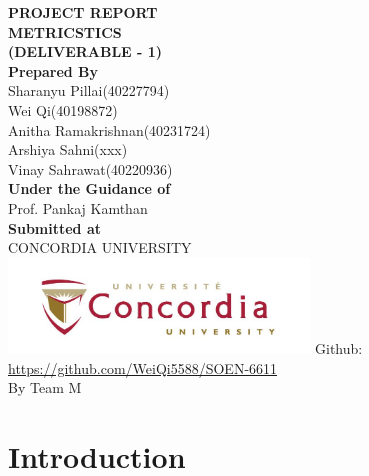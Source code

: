 \documentclass[english,12pt,a4paper]{report}
\begin{document}
	\begin{titlepage}
		\centering
		\Huge
		\textbf{PROJECT REPORT}\\
		\vspace{1cm}
		\textbf{METRICSTICS}\\
		\textbf{(DELIVERABLE - 1)}\\
		\vspace{1.5cm}
		\Large
		\textbf{Prepared By}\\
		\vspace{0.5cm}
		Sharanyu Pillai(40227794)\\
		Wei Qi(40198872)\\
		Anitha Ramakrishnan(40231724)\\
		Arshiya Sahni(xxx)\\
		Vinay Sahrawat(40220936)\\
		\vspace{1.5cm}
		\large
		\textbf{Under the Guidance of}\\
		Prof. Pankaj Kamthan \\
		\vspace{1.5cm}
		\textbf{Submitted at}\\
		CONCORDIA UNIVERSITY\\
		\centering
		\includegraphics[width=8cm]{concordia.jpg}
		\vfill
		Github:\\
		\url{https://github.com/WeiQi5588/SOEN-6611} \\
		By Team M
		\thispagestyle{empty} 
	\end{titlepage}
	
	\newpage 
	\setcounter{page}{0}
	\tableofcontents
	\clearpage
	
	

	
	\chapter{Introduction}
\end{document}
